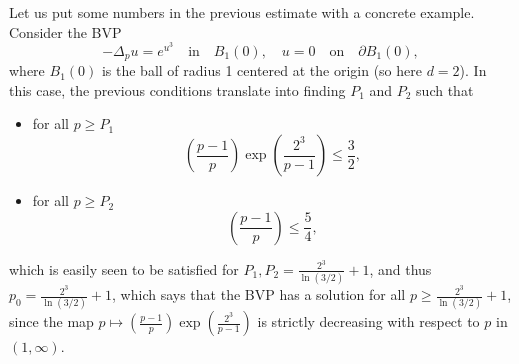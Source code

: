 \documentclass[11pt]{amsart}
\theoremstyle{definition}
\begin{document}
\medskip
Let us put some numbers in the previous estimate with a concrete example. Consider the BVP
\[
-\Delta_p u = e^{u^3} \quad \mbox{in} \quad B_1\left(0\right), \quad u=0 \quad \mbox{on}
\quad \partial B_1\left(0\right),
\]
where $B_1\left(0\right)$ is the ball of radius 1 centered at the origin (so here $d=2$). In this case, the previous conditions
translate into finding $P_1$ and $P_2$ such that
\begin{itemize}
    \item for all $p\geq P_1$
    \[
\left(\frac{p-1}{p}\right)
\exp\left(\frac{2^3}{p-1}\right)\leq \frac{3}{2},
\]
\item for all $p\geq P_2$
\[
\left(\frac{p-1}{p}\right)
 \leq \frac{5}{4},
\]
\end{itemize}
which is easily seen to be satisfied for $P_1,P_2=\frac{2^3}{\ln(3/2)}+1$, and thus $p_0=\frac{2^3}{\ln(3/2)}+1$, which says that the BVP has a solution 
for all $p\geq \frac{2^3}{\ln(3/2)}+1$, since the map $p\mapsto\left(\frac{p-1}{p}\right)\exp\left(\frac{2^3}{p-1}\right)$ is strictly decreasing with respect to $p$ in $(1,\infty)$.
\end{document}
